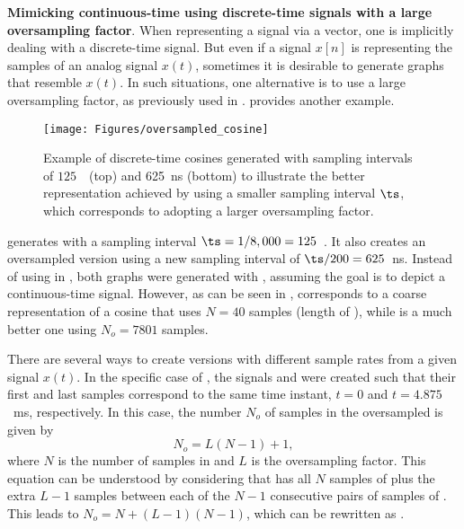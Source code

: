 \bExample \textbf{Mimicking continuous-time using discrete-time signals with a large oversampling factor}.
When representing a signal via a vector, one is implicitly dealing with a discrete-time signal.
But even if a signal $x[n]$ is representing the samples of an analog signal $x(t)$, sometimes
it is desirable to generate graphs that resemble $x(t)$. In such situations, one alternative is
to use a large oversampling factor, as previously used in .
 provides another example.


\begin{figure}
	\centering
		\texttt{[image: Figures/oversampled\_cosine]}		
	\caption{Example of discrete-time cosines generated with sampling intervals of  $125$~\mus~(top) and 625~ns (bottom) to illustrate
	the better representation achieved by using a smaller sampling interval $\ts$, which corresponds to adopting a larger oversampling factor.\label{fig:oversampled_cosine}}
\end{figure}

 generates  with a sampling interval $\ts=1/8,000=125$~\mus. 
It also creates an oversampled version  using a new sampling interval of $\ts/200 = 625$~ns.
Instead of using  in \matlab, both graphs were generated with , assuming the
goal is to depict a continuous-time signal.
However, as can be seen in ,  corresponds to a coarse representation
of a cosine that uses $N=40$ samples (length of ), while  is a much better one using $N_o=7801$ samples.
\eExample

There are several ways to create versions with different sample rates from a given signal $x(t)$.
In the specific case of , the signals  and  were created
such that their first and last samples correspond to the same time instant, $t=0$ and $t=4.875$~ms, respectively.
In this case, the number $N_o$ of samples in the oversampled  is given by
\begin{equation}
N_o = L (N -1) + 1,
\label{eq:oversampled_length}
\end{equation}
where $N$ is the number of samples in  and $L$ is the oversampling factor. This equation
can be understood by considering that  has all $N$ samples of  plus the extra $L-1$ samples
between each of the $N-1$ consecutive pairs of samples of . This leads to
$N_o = N + (L-1)(N-1)$, which can be rewritten as .


